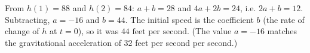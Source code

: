 From $h(1)=88$ and $h(2)=84$: $a+b=28$ and $4a+2b=24$, i.e. $2a+b=12$. Subtracting, $a=-16$ and $b=44$. The initial speed is the coefficient $b$ (the rate of change of $h$ at $t=0$), so it was $\boxed{44\text{ feet per second}}$. (The value $a=-16$ matches the gravitational acceleration of $32$ feet per second per second.)
